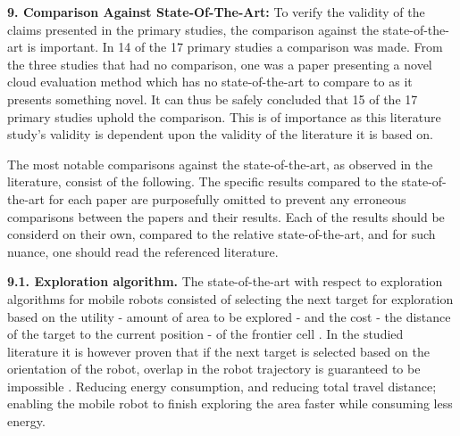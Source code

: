 \vspace{2mm}

\noindent\textbf{9. Comparison Against State-Of-The-Art:}
To verify the validity of the claims presented in the primary studies, the comparison against the state-of-the-art is important.
In 14 of the 17 primary studies a comparison was made.
From the three studies that had no comparison, one was a paper presenting a novel cloud evaluation method \cite{hou2017novel_cloud_evaluation_model}
which has no state-of-the-art to compare to as it presents something novel. 
It can thus be safely concluded that 15 of the 17 primary studies uphold the comparison.
This is of importance as this literature study's validity is dependent upon the validity of the literature it is based on.

The most notable comparisons against the state-of-the-art, as observed in the literature, consist of the following.
The specific results compared to the state-of-the-art for each paper are 
purposefully omitted to prevent any erroneous comparisons between the papers and their results.
Each of the results should be considerd on their own, 
compared to the relative state-of-the-art, and for such nuance, 
one should read the referenced literature.

\vspace{2mm} \noindent \textbf{9.1. Exploration algorithm.}
The state-of-the-art with respect to exploration algorithms for mobile robots
consisted of selecting the next target for exploration based on the utility - amount of area to be explored - 
and the cost - the distance of the target to the current position - of the frontier cell 
\cite{burgard2005multi_robot_exploration, simmons2000multi_robot_exploration,zlot2002multi_robot_exploration}.
In the studied literature it is however proven that if the next target is selected based on the orientation of the robot,
overlap in the robot trajectory is guaranteed to be impossible \cite{mei2006mobile_exploration}.
Reducing energy consumption, and reducing total travel distance; enabling the mobile robot 
to finish exploring the area faster while consuming less energy. 


